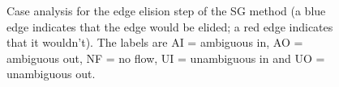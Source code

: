 \documentclass[a4paper]{article}
\newenvironment{stusubfig}[1]
{
	\begin{figure}[#1]
	\begin{center}
}
{
	\end{center}
	\end{figure}
}
\begin{document}
\begin{stusubfig}{p}
	\hspace{4mm}
\caption[Case analysis for the edge elision step of the SG method]{Case analysis for the edge elision step of the SG method (a blue edge indicates that the edge would be elided; a red edge indicates that it wouldn't). The labels are AI = ambiguous in, AO = ambiguous out, NF = no flow, UI = unambiguous in and UO = unambiguous out.}
\label{fig:segmentation-waterfall-smg-mergecases}
\end{stusubfig}
\end{document}
